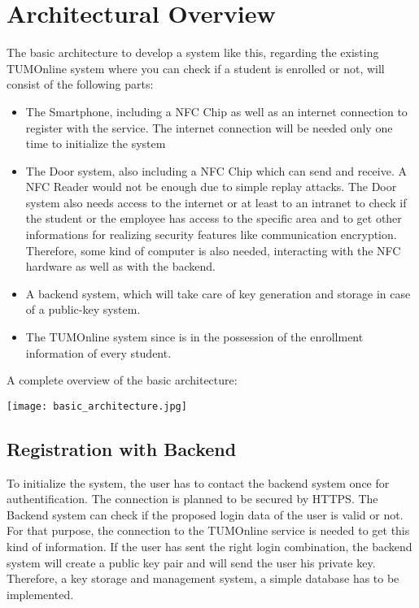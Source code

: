 \section{Architectural Overview}\label{sec:arch}

The basic architecture to develop a system like this, regarding the existing TUMOnline system where you can check if a student is enrolled or not, will consist of the following parts:

\begin{itemize}
\item The Smartphone, including a NFC Chip as well as an internet connection to register with the service. The internet connection will be needed only one time to initialize the system
\item The Door system, also including a NFC Chip which can send and receive. A NFC Reader would not be enough due to simple replay attacks. The Door system also needs access to the internet or at least to an intranet to check if the student or the employee has access to the specific area and to get other informations for realizing security features like communication encryption. Therefore, some kind of computer is also needed, interacting with the NFC hardware as well as with the backend.
\item A backend system, which will take care of key generation and storage in case of a public-key system.

\item The TUMOnline system since is in the possession of the enrollment information of every student.
\end{itemize} 
 
 A complete overview of the basic architecture: \newline
 \begin{center}
	\texttt{[image: basic\_architecture.jpg]}
\end{center}


\subsection{Registration with Backend}
To initialize the system, the user has to contact the backend system once for authentification. The connection is planned to be secured by HTTPS. The Backend system can check if the proposed login data of the user is valid or not. For that purpose, the connection to the TUMOnline service is needed to get this kind of  information. If the user has sent the right login combination, the backend system will create a public key pair and will send the user his private key. Therefore, a key storage and management system, a simple database has to be implemented.



